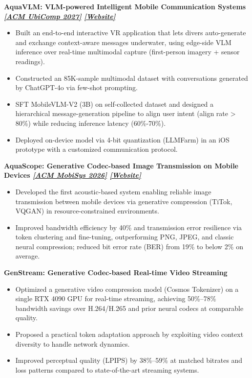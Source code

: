 \documentclass[10pt, letterpaper]{article}
\newcommand{\project}[1]{%
  \vspace{2pt}%
  \noindent\textbf{\color{navy}\small #1}%
  \vspace{1pt}
}
\begin{document}
\project{AquaVLM: VLM-powered Intelligent Mobile Communication Systems \hfill
  \normalfont\textit{\hyperlink{pub4}{\textcolor{linkblue}{[ACM UbiComp 2027]}}} \textit{\href{https://chutoutian.github.io/aquavlm.github.io/}{\textcolor{linkblue}{[Website]}}}}
\begin{itemize}
    \item Built an end-to-end interactive VR application that lets divers auto-generate and exchange context-aware messages underwater, using edge-side VLM inference over real-time multimodal capture (first-person imagery + sensor readings).
  \item Constructed an 85K-sample multimodal dataset with conversations generated by ChatGPT-4o via few-shot prompting.
  \item SFT MobileVLM-V2 (3B) on self-collected dataset and designed a hierarchical message-generation pipeline to align user intent (align rate > 80\%) while reducing inference latency (60\%-70\%).
  \item Deployed on-device model via 4-bit quantization (LLMFarm) in an iOS prototype with a customized communication protocol.
\end{itemize}


\project{AquaScope: Generative Codec-based Image Transmission on Mobile Devices \hfill
  \normalfont\textit{\hyperlink{pub2}{\textcolor{linkblue}{[ACM MobiSys 2026]}}} \textit{\href{https://chutoutian.github.io/aquascope.github.io/}{\textcolor{linkblue}{[Website]}}}}
\begin{itemize}
  \item Developed the first acoustic-based system enabling reliable image transmission between mobile devices via generative compression (TiTok, VQGAN) in resource-constrained environments.
  \item Improved bandwidth efficiency by 40\% and transmission error resilience via token clustering and fine-tuning, outperforming PNG, JPEG, and classic neural compression; reduced bit error rate (BER) from 19\% to below 2\% on average.
\end{itemize}

\par\project{GenStream: Generative Codec-based Real-time Video Streaming \hfill
  \normalfont\textit{\textcolor{lightgray}{}}}
\begin{itemize}
  \item Optimized a generative video compression model (Cosmos Tokenizer) on a single RTX 4090 GPU for real-time streaming, achieving 50\%--78\% bandwidth savings over H.264/H.265 and prior neural codecs at comparable quality.
  \item Proposed a practical token adaptation approach by exploiting video context diversity to handle network dynamics.
  \item Improved perceptual quality (LPIPS) by 38\%--59\% at matched bitrates and loss patterns compared to state-of-the-art streaming systems.
\end{itemize}
\end{document}
